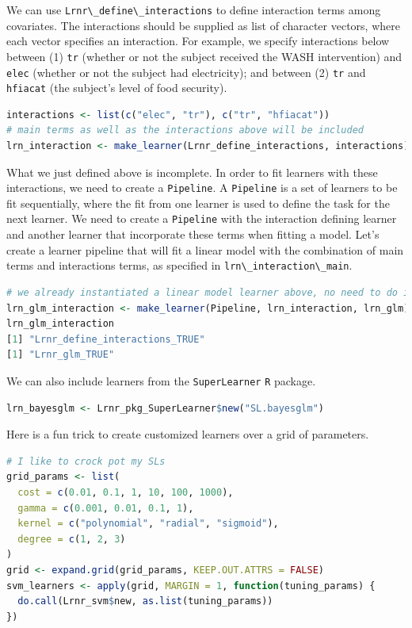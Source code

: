 \documentclass[12pt, krantz2,]{krantz}
\newcommand{\passthrough}[1]{#1}
\theoremstyle{definition}
\theoremstyle{definition}
\theoremstyle{definition}
\newcommand{\1}{\mathbbm{1}}
\begin{document}
We can use \passthrough{\lstinline!Lrnr\_define\_interactions!} to define interaction terms among
covariates. The interactions should be supplied as list of character vectors,
where each vector specifies an interaction. For example, we specify
interactions below between (1) \passthrough{\lstinline!tr!} (whether or not the subject received the
WASH intervention) and \passthrough{\lstinline!elec!} (whether or not the subject had electricity); and
between (2) \passthrough{\lstinline!tr!} and \passthrough{\lstinline!hfiacat!} (the subject's level of food security).

\begin{lstlisting}[language=R]
interactions <- list(c("elec", "tr"), c("tr", "hfiacat"))
# main terms as well as the interactions above will be included
lrn_interaction <- make_learner(Lrnr_define_interactions, interactions)
\end{lstlisting}

What we just defined above is incomplete. In order to fit learners with these
interactions, we need to create a \passthrough{\lstinline!Pipeline!}. A \passthrough{\lstinline!Pipeline!} is a set of learners
to be fit sequentially, where the fit from one learner is used to define the
task for the next learner. We need to create a \passthrough{\lstinline!Pipeline!} with the interaction
defining learner and another learner that incorporate these terms when fitting
a model. Let's create a learner pipeline that will fit a linear model with the
combination of main terms and interactions terms, as specified in
\passthrough{\lstinline!lrn\_interaction\_main!}.

\begin{lstlisting}[language=R]
# we already instantiated a linear model learner above, no need to do it again
lrn_glm_interaction <- make_learner(Pipeline, lrn_interaction, lrn_glm)
lrn_glm_interaction
[1] "Lrnr_define_interactions_TRUE"
[1] "Lrnr_glm_TRUE"
\end{lstlisting}

We can also include learners from the \passthrough{\lstinline!SuperLearner!} \passthrough{\lstinline!R!} package.

\begin{lstlisting}[language=R]
lrn_bayesglm <- Lrnr_pkg_SuperLearner$new("SL.bayesglm")
\end{lstlisting}

Here is a fun trick to create customized learners over a grid of parameters.

\begin{lstlisting}[language=R]
# I like to crock pot my SLs
grid_params <- list(
  cost = c(0.01, 0.1, 1, 10, 100, 1000),
  gamma = c(0.001, 0.01, 0.1, 1),
  kernel = c("polynomial", "radial", "sigmoid"),
  degree = c(1, 2, 3)
)
grid <- expand.grid(grid_params, KEEP.OUT.ATTRS = FALSE)
svm_learners <- apply(grid, MARGIN = 1, function(tuning_params) {
  do.call(Lrnr_svm$new, as.list(tuning_params))
})
\end{lstlisting}
\end{document}

